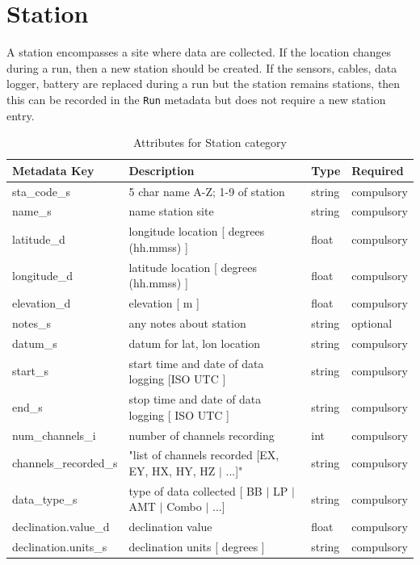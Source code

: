 \documentclass{article}
\begin{document}
\newpage
\section{Station}

A station encompasses a site where data are collected. If the location changes during a run, then a new station should be created. If the sensors, cables, data logger, battery are replaced during a run but the station remains stations, then this can be recorded in the \verb|Run| metadata but does not require a new station entry.

\begin{table}[htb!]
	\caption[Attributes for Station]{Attributes for Station category}
	\begin{tabular}{|l|p{3in}|l|l|}
		\hline
		\textbf{Metadata Key} & \textbf{Description} & \textbf{Type} & \textbf{Required} \\ \hline
		sta\_code\_s & 5 char name {A-Z; 1-9} of station & string & compulsory \\ \hline
		name\_s & name station site & string & compulsory \\ \hline
		latitude\_d & longitude location [ degrees (hh.mmss) ] & float & compulsory \\ \hline
		longitude\_d & latitude location [ degrees (hh.mmss) ] & float & compulsory \\ \hline
		elevation\_d & elevation [ m ] & float & compulsory \\ \hline
		notes\_s & any notes about station & string & optional \\ \hline
		datum\_s & datum for lat, lon location & string & compulsory \\ \hline
		start\_s & start time and date of data logging [ISO UTC ] & string & compulsory \\ \hline
		end\_s & stop time and date of data logging  [ ISO UTC ] & string & compulsory \\ \hline
		num\_channels\_i & number of channels recording & int & compulsory \\ \hline
		channels\_recorded\_s & "list of channels recorded [EX, EY, HX, HY, HZ $|$ ...]" & string & compulsory \\ \hline
		data\_type\_s & type of data collected [ BB $|$ LP $|$ AMT $|$ Combo $|$ ...] & string & compulsory \\ \hline
		declination.value\_d & declination value & float & compulsory \\ \hline
		declination.units\_s & declination units [ degrees ] & string & compulsory \\ \hline

\end{tabular}
\end{table}
\end{document}
